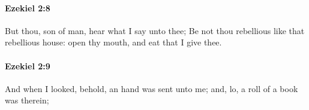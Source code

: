 		\paragraph{Ezekiel 2:8} %
			\label{EZEKIEL-2-8}

			But thou, son of man, hear what I say unto thee; Be not thou rebellious like that rebellious house: open thy mouth, and eat that I give thee.


		\paragraph{Ezekiel 2:9} %
			\label{EZEKIEL-2-9}

			And when I looked, behold, an hand was sent unto me; and, lo, a roll of a book was therein;


